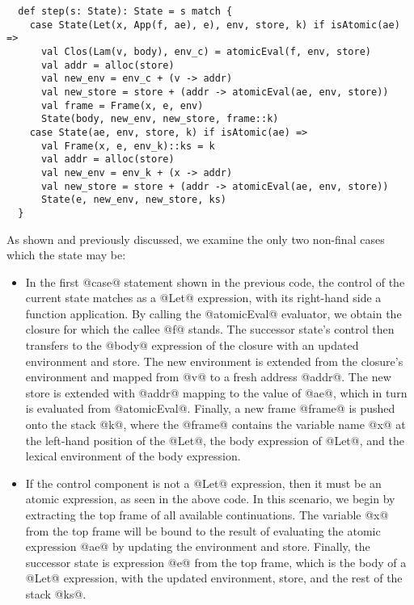 \documentclass[acmsmall, screen]{acmart}\settopmatter{}
\begin{document}
\begin{lstlisting}
  def step(s: State): State = s match {
    case State(Let(x, App(f, ae), e), env, store, k) if isAtomic(ae) =>
      val Clos(Lam(v, body), env_c) = atomicEval(f, env, store)
      val addr = alloc(store)
      val new_env = env_c + (v -> addr)
      val new_store = store + (addr -> atomicEval(ae, env, store))
      val frame = Frame(x, e, env)
      State(body, new_env, new_store, frame::k)
    case State(ae, env, store, k) if isAtomic(ae) =>
      val Frame(x, e, env_k)::ks = k
      val addr = alloc(store)
      val new_env = env_k + (x -> addr)
      val new_store = store + (addr -> atomicEval(ae, env, store))
      State(e, new_env, new_store, ks)
  }
\end{lstlisting}

As shown and previously discussed, we examine the only two non-final cases which the state
may be:

\begin{itemize}

\item In the first @case@ statement shown in the previous code, the control of the current
  state matches as a @Let@ expression, with its right-hand side a function application.
  By calling the @atomicEval@ evaluator, we obtain the closure for which the callee @f@ stands.
  The successor state's control then transfers to the @body@ expression of the closure with
  an updated environment and store. The new environment is extended from the closure's
  environment and mapped from @v@ to a fresh address @addr@. The new store is extended with
  @addr@ mapping to the value of @ae@, which in turn is evaluated from @atomicEval@.
  Finally, a new frame @frame@ is pushed onto the stack @k@, where the @frame@ contains
  the variable name @x@ at the left-hand position of the @Let@, the body expression of
  @Let@, and the lexical environment of the body expression.

\item If the control component is not a @Let@ expression, then it must be an atomic
  expression, as seen in the above code. In this scenario, we begin by extracting the
  top frame of all available continuations. The variable @x@ from the top frame will
  be bound to the result of evaluating the atomic expression @ae@ by updating the
  environment and store.
  Finally, the successor state is expression @e@ from the top frame,
  which is the body of a @Let@ expression, with the updated environment, store, and
  the rest of the stack @ks@.

\end{itemize}
\end{document}
